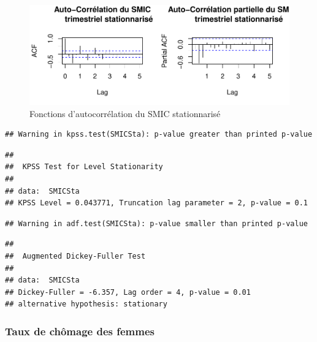 \documentclass[11pt,]{article}
\begin{document}
\begin{figure}[htbp]
\centering
\includegraphics{doc_files/figure-latex/unnamed-chunk-19-1.pdf}
\caption{\label{fig16} Fonctions d'autocorrélation du SMIC
stationnarisé}
\end{figure}

\begin{verbatim}
## Warning in kpss.test(SMICSta): p-value greater than printed p-value
\end{verbatim}

\begin{verbatim}
## 
##  KPSS Test for Level Stationarity
## 
## data:  SMICSta
## KPSS Level = 0.043771, Truncation lag parameter = 2, p-value = 0.1
\end{verbatim}

\begin{verbatim}
## Warning in adf.test(SMICSta): p-value smaller than printed p-value
\end{verbatim}

\begin{verbatim}
## 
##  Augmented Dickey-Fuller Test
## 
## data:  SMICSta
## Dickey-Fuller = -6.357, Lag order = 4, p-value = 0.01
## alternative hypothesis: stationary
\end{verbatim}

\newpage

\subsubsection{Taux de chômage des
femmes}\label{taux-de-chomage-des-femmes-1}
\end{document}
